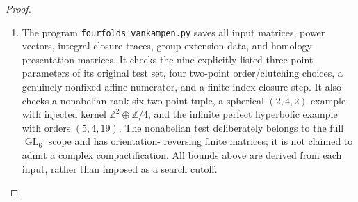\begin{proof}
\begin{enumerate}[label=\arabic*.]
\item The program \texttt{fourfolds\_vankampen.py} saves all input
matrices, power vectors, integral closure traces, group
extension data, and homology presentation matrices.
It checks the nine explicitly listed three-point parameters
of its original test set, four two-point order/clutching
choices, a genuinely nonfixed affine numerator, and a
finite-index closure step.  It also checks a nonabelian
rank-six two-point tuple, a spherical $(2,4,2)$ example
with injected kernel $\mathbb Z^2\oplus\mathbb Z/4$, and
the infinite perfect hyperbolic example with orders
$(5,4,19)$.  The nonabelian test deliberately belongs to
the full $\operatorname{GL}_6$ scope and has orientation-
reversing finite matrices; it is not claimed to admit a
complex compactification.  All bounds above are derived
from each input, rather than imposed as a search cutoff.

\end{enumerate}
\end{proof}




